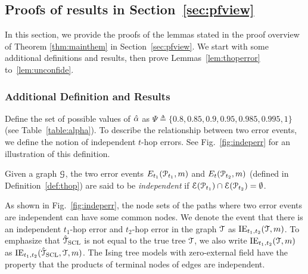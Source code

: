 \subsection{Proofs of results in Section~\ref{sec:pfview}}
In this section, we provide the proofs of the lemmas stated in the proof overview of Theorem \ref{thm:mainthem} in Section~\ref{sec:pfview}. We start with some additional definitions and results, then prove Lemmas~\ref{lem:thoperror} to~\ref{lem:unconfide}. 
\subsubsection{Additional Definition and Results}
  Define the set of possible values of $\hat{\alpha}$ as  $\Psi\triangleq\{0.8,0.85,0.9,0.95,0.985,0.995,1\}$ (see Table~\ref{table:alpha}). To describe the relationship between two error events, we define the notion of independent $t$-hop errors. See Fig.~\ref{fig:indeperr} for an illustration of this definition.
\begin{definition}
	Given a graph $\mathcal{G}$, the two error events $E_{t_{1}}(\mathcal{P}_{t_{1}},m)$ and $E_{t}(\mathcal{P}_{t_{2}},m)$ (defined in Definition~\ref{def:thop}) are said to be {\em independent}  if $\mathcal{E} (\mathcal{P}_{t_{1}} )\cap\mathcal{E} (\mathcal{P}_{t_{2}} )= \emptyset$. 
\end{definition}
As shown in Fig.~\ref{fig:indeperr}, the node sets of the paths where two error events are independent can have some common nodes. We denote the event that there is an independent $t_{1}$-hop error and $t_{2}$-hop error in the graph $\mathcal{T}$ as $\mathrm{IE}_{t_{1},t_{2}}(\mathcal{T},m)$. To emphasize that $\hat{\mathcal{T}}_{{\rm SCL}}$ is not equal to the true tree $\mathcal{T}$, we also write $\mathrm{IE}_{t_{1},t_{2}}(\mathcal{T},m)$ as $\mathrm{IE}_{t_{1},t_{2}}(\hat{\mathcal{T}}_{{\rm SCL}},\mathcal{T},m)$.
The Ising tree models with zero-external field have the property that the products of terminal nodes of edges are independent\cite{nikolakakis2021predictive}.

